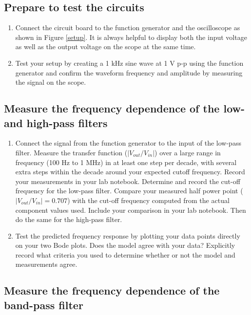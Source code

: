 \documentclass[10pt]{PhysLab1C} %
\begin{document}
\subsection{Prepare to test the circuits}


\begin{enumerate}
\def\labelenumi{\arabic{enumi}.}
\item
  Connect the circuit board to the function generator and the
  oscilloscope as shown in Figure \ref{setup}. It is always helpful to display both
  the input voltage as well as the output voltage on the scope at the
  same time.
\item
  Test your setup by creating a 1 kHz sine wave at 1 V p-p using the
  function generator and confirm the waveform frequency and amplitude by
  measuring the signal on the scope.
\end{enumerate}


\subsection{Measure the frequency dependence of the low- and high-pass filters}


\begin{enumerate}
\def\labelenumi{\arabic{enumi}.}
\item
  Connect the signal from the function generator to the input of the
  low-pass filter. Measure the transfer function (\(|V_{out}/V_{in}|\))
  over a large range in frequency (100 Hz to 1 MHz) in at least one step
  per decade, with several extra steps within the decade around your
  expected cutoff frequency. Record your measurements in your lab
  notebook. Determine and record the cut-off frequency for the low-pass
  filter. Compare your measured half power point
  (\(|V_{out}/V_{in}|=0.707\)) with the cut-off frequency computed from
  the actual component values used. Include your comparison in your lab
  notebook. Then do the same for the high-pass filter.
\item
  Test the predicted frequency response by plotting your data points
  directly on your two Bode plots. Does the model agree with your data?
  Explicitly record what criteria you used to determine whether or not
  the model and measurements agree.
\end{enumerate}

\subsection{Measure the frequency dependence of the band-pass filter}
\end{document}
